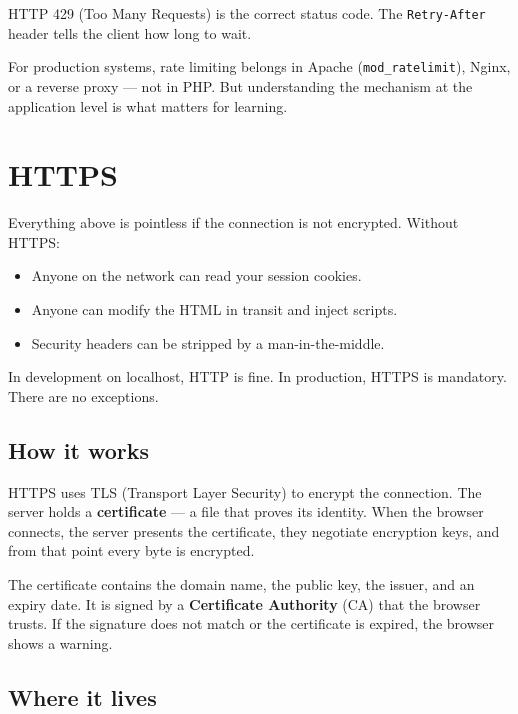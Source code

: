 \documentclass[11pt,a4paper,oneside]{book}
\providecommand{\tightlist}{%
  \setlength{\itemsep}{0pt}\setlength{\parskip}{0pt}}
\begin{document}
HTTP 429 (Too Many Requests) is the correct status code. The
\texttt{Retry-After} header tells the client how long to wait.

For production systems, rate limiting belongs in Apache
(\texttt{mod\_ratelimit}), Nginx, or a reverse proxy --- not in
PHP. But understanding the mechanism at the application level is
what matters for learning.

\hypertarget{https}{%
\section{HTTPS}\label{https}}

Everything above is pointless if the connection is not encrypted.
Without HTTPS:

\begin{itemize}
\tightlist
\item
  Anyone on the network can read your session cookies.
\item
  Anyone can modify the HTML in transit and inject scripts.
\item
  Security headers can be stripped by a man-in-the-middle.
\end{itemize}

In development on localhost, HTTP is fine. In production, HTTPS
is mandatory. There are no exceptions.

\hypertarget{how-it-works}{%
\subsection{How it works}\label{how-it-works}}

HTTPS uses TLS (Transport Layer Security) to encrypt the
connection. The server holds a \textbf{certificate} --- a file
that proves its identity. When the browser connects, the server
presents the certificate, they negotiate encryption keys, and
from that point every byte is encrypted.

The certificate contains the domain name, the public key, the
issuer, and an expiry date. It is signed by a \textbf{Certificate
Authority} (CA) that the browser trusts. If the signature does
not match or the certificate is expired, the browser shows a
warning.

\hypertarget{where-it-lives}{%
\subsection{Where it lives}\label{where-it-lives}}
\end{document}
